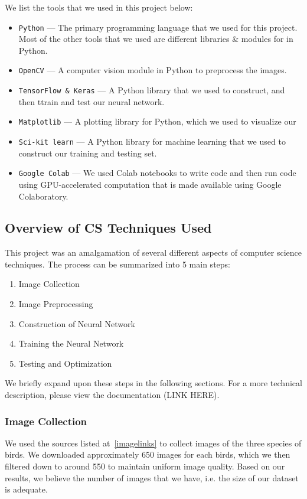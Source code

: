 \documentclass[11pt]{article}
\begin{document}
  We list the tools that we used in this project below:
  \setlength{\parskip}{0em}
  \begin{itemize}
    \item \texttt{Python} --- The primary programming language that we used for this project.
      Most of the other tools that we used are different libraries \& modules for in Python.
    \item \texttt{OpenCV} --- A computer vision module in Python to preprocess the images. 
    \item \texttt{TensorFlow \& Keras} --- A Python library that we used to construct, and then 
      ttrain and test our neural network. 
    \item \texttt{Matplotlib} --- A plotting library for Python, which we used to visualize our
    \item \texttt{Sci-kit learn} --- A Python library for machine learning that we used to 
      construct our training and testing set. 
    \item \texttt{Google Colab} --- We used Colab notebooks to write code and then run code
      using GPU-accelerated computation that is made available using Google Colaboratory.
  \end{itemize}
 
\subsection{Overview of CS Techniques Used}
  This project was an amalgamation of several different aspects of computer science techniques.
  The process can be summarized into 5 main steps:
  \begin{enumerate}
    \item Image Collection
    \item Image Preprocessing 
    \item Construction of Neural Network 
    \item Training the Neural Network
    \item Testing and Optimization
  \end{enumerate}
  
  We briefly expand upon these steps in the following sections. For a more technical 
  description, please view the documentation (LINK HERE). 

  \subsubsection{Image Collection}
  We used the sources listed at~\ref{imagelinks} to collect images of the three species of birds.
  We downloaded approximately 650 images for each birds, which we then filtered
  down to around 550 to maintain uniform image quality. Based on our results, we believe
  the number of images that we have, i.e. the size of our dataset is adequate. 
  
\end{document}
